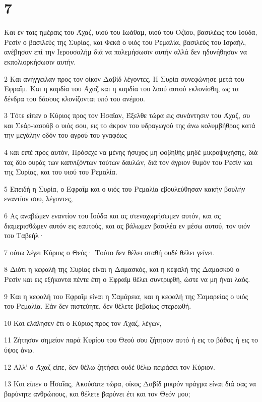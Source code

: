 \chapter{7}

\par Και εν ταις ημέραις του Άχαζ, υιού του Ιωάθαμ, υιού του Οζίου, βασιλέως του Ιούδα, Ρεσίν ο βασιλεύς της Συρίας, και Φεκά ο υιός του Ρεμαλία, βασιλεύς του Ισραήλ, ανέβησαν επί την Ιερουσαλήμ διά να πολεμήσωσιν αυτήν αλλά δεν ηδυνήθησαν να εκπολιορκήσωσιν αυτήν.
\par 2 Και ανήγγειλαν προς τον οίκον Δαβίδ λέγοντες, Η Συρία συνεφώνησε μετά του Εφραΐμ. Και η καρδία του Άχαζ και η καρδία του λαού αυτού εκλονίσθη, ως τα δένδρα του δάσους κλονίζονται υπό του ανέμου.
\par 3 Τότε είπεν ο Κύριος προς τον Ησαΐαν, Έξελθε τώρα εις συνάντησιν του Άχαζ, συ και Σεάρ-ιασούβ ο υιός σου, εις το άκρον του υδραγωγού της άνω κολυμβήθρας κατά την μεγάλην οδόν του αγρού του γναφέως
\par 4 και ειπέ προς αυτόν, Πρόσεχε να μένης ήσυχος μη φοβηθής μηδέ μικροψυχήσης, διά τας δύο ουράς των καπνιζόντων τούτων δαυλών, διά τον άγριον θυμόν του Ρεσίν και της Συρίας, και του υιού του Ρεμαλία.
\par 5 Επειδή η Συρία, ο Εφραΐμ και ο υιός του Ρεμαλία εβουλεύθησαν κακήν βουλήν εναντίον σου, λέγοντες,
\par 6 Ας αναβώμεν εναντίον του Ιούδα και ας στενοχωρήσωμεν αυτόν, και ας διαμερισθώμεν αυτόν εις εαυτούς, και ας βάλωμεν βασιλέα εν μέσω αυτού, τον υιόν του Ταβεήλ·
\par 7 ούτω λέγει Κύριος ο Θεός· Τούτο δεν θέλει σταθή ουδέ θέλει γείνει.
\par 8 Διότι η κεφαλή της Συρίας είναι η Δαμασκός, και η κεφαλή της Δαμασκού ο Ρεσίν και εις εξήκοντα πέντε έτη ο Εφραΐμ θέλει συντριφθή, ώστε να μη ήναι λαός.
\par 9 Και η κεφαλή του Εφραΐμ είναι η Σαμάρεια, και η κεφαλή της Σαμαρείας ο υιός του Ρεμαλία. Εάν δεν πιστεύητε, δεν θέλετε βεβαίως στερεωθή.
\par 10 Και ελάλησεν έτι ο Κύριος προς τον Άχαζ, λέγων,
\par 11 Ζήτησον σημείον παρά Κυρίου του Θεού σου ζήτησον αυτό ή εις το βάθος ή εις το ύψος άνω.
\par 12 Αλλ' ο Άχαζ είπε, δεν θέλω ζητήσει ουδέ θέλω πειράσει τον Κύριον.
\par 13 Και είπεν ο Ησαΐας, Ακούσατε τώρα, οίκος Δαβίδ μικρόν πράγμα είναι διά σας να βαρύνητε ανθρώπους, και θέλετε βαρύνει έτι και τον Θεόν μου;
